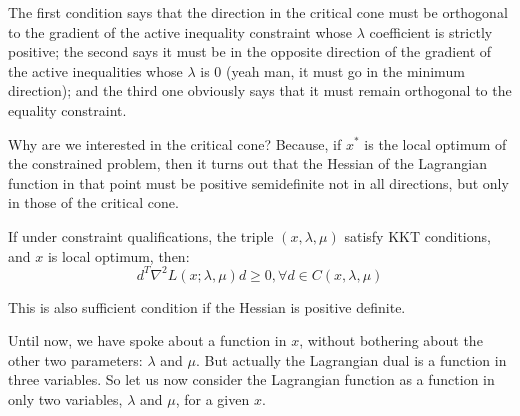 The first condition says that the direction in the critical cone must be orthogonal to the gradient of the active inequality constraint whose $\lambda$ coefficient is strictly positive; the second says it must be in the opposite direction of the gradient of the active inequalities whose $\lambda$ is 0 (yeah man, it must go in the minimum direction); and the third one obviously says that it must remain orthogonal to the equality constraint.
\par Why are we interested in the critical cone? Because, if $x^*$ is the local optimum of the constrained problem, then it turns out that the Hessian of the Lagrangian function in that point must be positive semidefinite not in all directions, but only in those of the critical cone.
\begin{theorem}
    If under constraint qualifications, the triple $(x,\lambda,\mu)$ satisfy KKT conditions, and $x$ is local optimum, then:
    \[
    d^T \nabla^2 L(x; \lambda, \mu)d \geq 0, \forall d \in C(x,\lambda,\mu)
    \]
\end{theorem}
This is also sufficient condition if the Hessian is positive definite.
\par Until now, we have spoke about a function in $x$, without bothering about the other two parameters: $\lambda$ and $\mu$. But actually the Lagrangian dual is a function in three variables. So let us now consider the Lagrangian function as a function in only two variables, $\lambda$ and $\mu$, for a given $x$.
%
